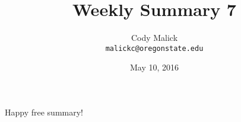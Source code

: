 \documentclass[10pt,letterpaper]{article}
\begin{document}
  \title{Weekly Summary 7}
  \author{Cody Malick\\
  \texttt{malickc@oregonstate.edu}}
  \date{May 10, 2016}
  \maketitle
    Happy free summary!
  
\end{document}
